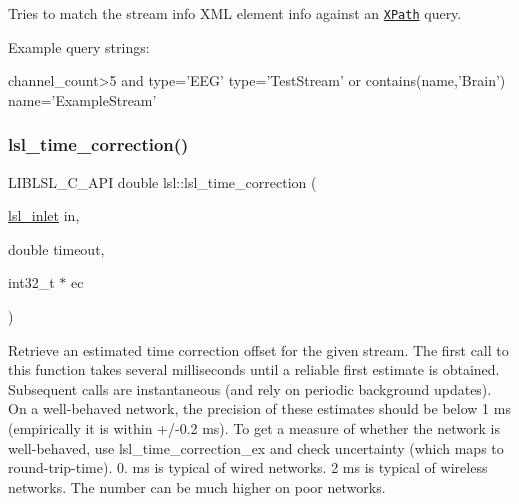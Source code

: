 Tries to match the stream info X\+ML element {\ttfamily info} against an \href{https://en.wikipedia.org/wiki/XPath#Syntax_and_semantics_(XPath_1.0)}{\tt X\+Path} query.

Example query strings\+: 
\begin{DoxyCode}
channel\_count>5 and type=\textcolor{stringliteral}{'EEG'}
type=\textcolor{stringliteral}{'TestStream'} or contains(name,\textcolor{stringliteral}{'Brain'})
name='ExampleStream'
\end{DoxyCode}
 \mbox{\label{namespacelsl_a4a017b7c6d6fbe056b5394b1edff0994}} 
\subsubsection{\texorpdfstring{lsl\+\_\+time\+\_\+correction()}{lsl\_time\_correction()}}
{\footnotesize\ttfamily L\+I\+B\+L\+S\+L\+\_\+\+C\+\_\+\+A\+PI double lsl\+::lsl\+\_\+time\+\_\+correction (\begin{DoxyParamCaption}\item[{\hyperlink{namespacelsl_a884a3363cfcba75d7ce8f00c1c4c54f1}{lsl\+\_\+inlet}}]{in,  }\item[{double}]{timeout,  }\item[{int32\+\_\+t $\ast$}]{ec }\end{DoxyParamCaption})}

Retrieve an estimated time correction offset for the given stream. The first call to this function takes several milliseconds until a reliable first estimate is obtained. Subsequent calls are instantaneous (and rely on periodic background updates). On a well-\/behaved network, the precision of these estimates should be below 1 ms (empirically it is within +/-\/0.2 ms). To get a measure of whether the network is well-\/behaved, use lsl\+\_\+time\+\_\+correction\+\_\+ex and check uncertainty (which maps to round-\/trip-\/time). 0. ms is typical of wired networks. 2 ms is typical of wireless networks. The number can be much higher on poor networks.



